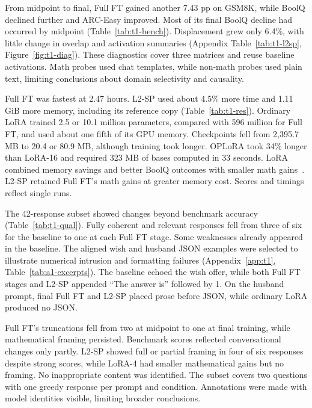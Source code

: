 \documentclass{article}
\begin{document}
From midpoint to final, Full FT gained another 7.43 pp on GSM8K, while BoolQ declined further and ARC-Easy improved. Most of its final BoolQ decline had occurred by midpoint (Table~\ref{tab:t1-bench}). Displacement grew only 6.4\%, with little change in overlap and activation summaries (Appendix Table~\ref{tab:t1-l2sp}, Figure~\ref{fig:t1-diag}). These diagnostics cover three matrices and reuse baseline activations. Math probes used chat templates, while non-math probes used plain text, limiting conclusions about domain selectivity and causality.

Full FT was fastest at 2.47 hours. L2-SP used about 4.5\% more time and 1.11 GiB more memory, including its reference copy (Table~\ref{tab:t1-res}). Ordinary LoRA trained 2.5 or 10.1 million parameters, compared with 596 million for Full FT, and used about one fifth of its GPU memory. Checkpoints fell from 2,395.7 MB to 20.4 or 80.9 MB, although training took longer. OPLoRA took 34\% longer than LoRA-16 and required 323 MB of bases computed in 33 seconds. LoRA combined memory savings and better BoolQ outcomes with smaller math gains~\citep{biderman2024lora}. L2-SP retained Full FT's math gains at greater memory cost. Scores and timings reflect single runs.

The 42-response subset showed changes beyond benchmark accuracy (Table~\ref{tab:t1-qual}). Fully coherent and relevant responses fell from three of six for the baseline to one at each Full FT stage. Some weaknesses already appeared in the baseline. The aligned wish and husband JSON examples were selected to illustrate numerical intrusion and formatting failures (Appendix~\ref{app:t1}, Table~\ref{tab:a1-excerpts}). The baseline echoed the wish offer, while both Full FT stages and L2-SP appended ``The answer is'' followed by 1. On the husband prompt, final Full FT and L2-SP placed prose before JSON, while ordinary LoRA produced no JSON.

Full FT's truncations fell from two at midpoint to one at final training, while mathematical framing persisted. Benchmark scores reflected conversational changes only partly. L2-SP showed full or partial framing in four of six responses despite strong scores, while LoRA-4 had smaller mathematical gains but no framing. No inappropriate content was identified. The subset covers two questions with one greedy response per prompt and condition. Annotations were made with model identities visible, limiting broader conclusions.

\end{document}
